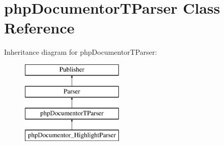 \hypertarget{classphp_documentor_t_parser}{\section{php\-Documentor\-T\-Parser \-Class \-Reference}
\label{classphp_documentor_t_parser}
}
\-Inheritance diagram for php\-Documentor\-T\-Parser\-:\begin{figure}[H]
\begin{center}
\leavevmode
\includegraphics[height=4.000000cm]{classphp_documentor_t_parser}
\end{center}
\end{figure}

